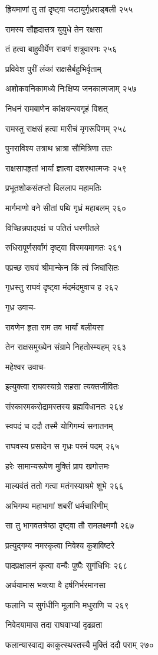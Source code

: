 ह्रियमाणां तु तां दृष्ट्वा जटायुर्गृध्रराड्बली २५५

रामस्य सौहृदात्तत्र युयुधे तेन रक्षसा

तं हत्वा बाहुवीर्येण रावणं शत्रुवारणः २५६

प्रविवेश पुरीं लंकां राक्षसैर्बहुभिर्वृताम्

अशोकवनिकामध्ये निःक्षिप्य जनकात्मजाम् २५७

निधनं रामबाणेन कांक्षयन्स्वगृहं विशत्

रामस्तु राक्षसं हत्वा मारीचं मृगरूपिणम् २५८

पुनराविश्य तत्राथ भ्रात्रा सौमित्रिणा ततः

राक्षसापहृतां भार्यां ज्ञात्वा दशरथात्मजः २५९

प्रभूतशोकसंतप्तो विललाप महामतिः

मार्गमाणो वने सीतां पथि गृध्रं महाबलम् २६०

विच्छिन्नपादपक्षं च पतितं धरणीतले

रुधिरापूर्णसर्वांगं दृष्ट्वा विस्मयमागतः २६१

पप्रच्छ राघवं श्रीमान्केन किं त्वं जिघांसितः

गृध्रस्तु राघवं दृष्ट्वा मंदमंदमुवाच ह २६२

गृध्र उवाच-

रावणेन हृता राम तव भार्यां बलीयसा

तेन राक्षसमुख्येन संग्रामे निहतोस्म्यहम् २६३

महेश्वर उवाच-

इत्युक्त्वा राघवस्याग्रे सहसा त्यक्तजीवितः

संस्कारमकरोद्रामस्तस्य ब्रह्मविधानतः २६४

स्वपदं च ददौ तस्मै योगिगम्यं सनातनम्

राघवस्य प्रसादेन स गृध्रः परमं पदम् २६५

हरेः सामान्यरूपेण मुक्तिं प्राप खगोत्तमः

माल्यवंतं ततो गत्वा मतंगस्याश्रमे शुभे २६६

अभिगम्य महाभागां शबरीं धर्मचारिणीम्

सा तु भागवतश्रेष्ठा दृष्ट्वा तौ रामलक्ष्मणौ २६७

प्रत्युद्गम्य नमस्कृत्वा निवेश्य कुशविष्टरे

पादप्रक्षालनं कृत्वा वन्यैः पुष्पैः सुगंधिभिः २६८

अर्चयामास भक्त्या वै हर्षनिर्भरमानसा

फलानि च सुगंधीनि मूलानि मधुराणि च २६९

निवेदयामास तदा राघवाभ्यां दृढव्रता

फलान्यास्वाद्य काकुत्स्थस्तस्यै मुक्तिं ददौ पराम् २७०

